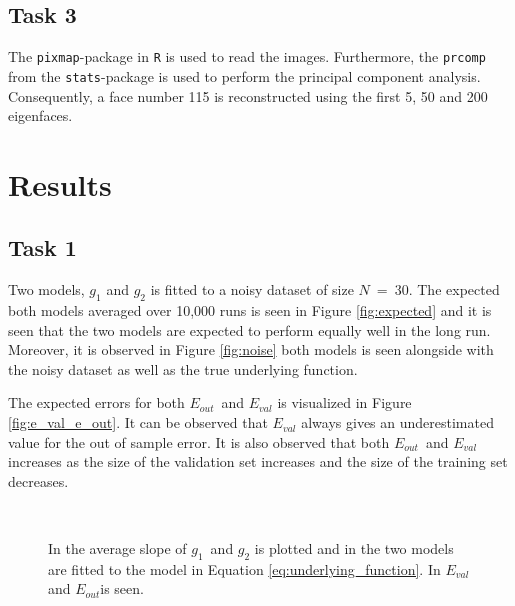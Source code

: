 \documentclass[a4paper,10pt]{article}
\begin{document}
\subsection{Task 3}
The \texttt{pixmap}-package in \texttt{R} is used to read the images. Furthermore, the
\texttt{prcomp} from the \texttt{stats}-package is used to perform
the principal component analysis. Consequently, a face number 115 is
reconstructed using the first 5, 50 and 200 eigenfaces.

\section{Results}
\subsection{Task 1}
Two models, $g_1$ and $g_2$ is fitted to a noisy dataset of size $N\ =\ 30$. The expected
both models averaged over 10,000 runs is seen in Figure {\ref{fig:expected}} and it is seen
that the two models are expected to perform equally well in the long run. Moreover, it is observed
in Figure {\ref{fig:noise}} both models is seen alongside with the noisy dataset as well
as the true underlying function. \newline

The expected errors for both $E_{out}$ and $E_{val}$ is visualized in Figure {\ref{fig:e_val_e_out}}.
It can be observed that $E_{val}$ always gives an underestimated value for
the out of sample error. It is also observed that both $E_{out}$ and $E_{val}$ increases
as the size of the validation set increases and the size of the training set decreases.

\begin{figure}[H]
   \\
  \centering
  \caption{In \protect {} the average slope of $g_1$ and $g_2$ is plotted and in \protect {}
  the two models are fitted to the model in Equation {\ref{eq:underlying_function}}. In \protect {} $E_{val}$ and $E_{out}$is seen. }
\end{figure}
\end{document}
